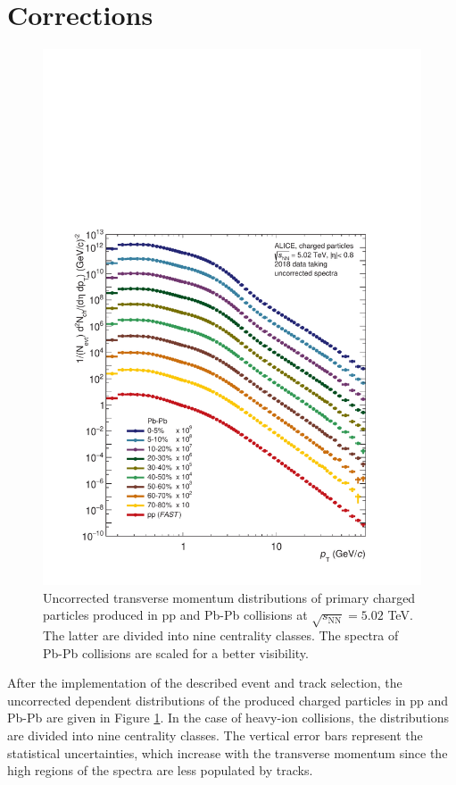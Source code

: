 \documentclass[12pt,a4paper]{report}
\begin{document}
\section{Corrections}
\begin{figure}[tb!]
\centering
\includegraphics[width=12cm]{Plots/uncorrectedSpectra.pdf}  
\caption{Uncorrected transverse momentum distributions of primary charged particles produced in pp and Pb-Pb collisions at $\sqrt{s_\text{NN}} = 5.02$ TeV. The latter are divided into nine centrality classes. The \pt spectra of Pb-Pb collisions are scaled for a better visibility. }
\label{uncorrSpec}
\end{figure}
After the implementation of the described event and track selection, the uncorrected \pt dependent distributions of the produced charged particles in pp and Pb-Pb are given in Figure \ref{uncorrSpec}. In the case of heavy-ion collisions, the \pt distributions are divided into nine centrality classes. The vertical error bars represent the statistical uncertainties, which increase with the transverse momentum since the high \pt regions of the spectra are less populated by tracks.  \\
\end{document}
